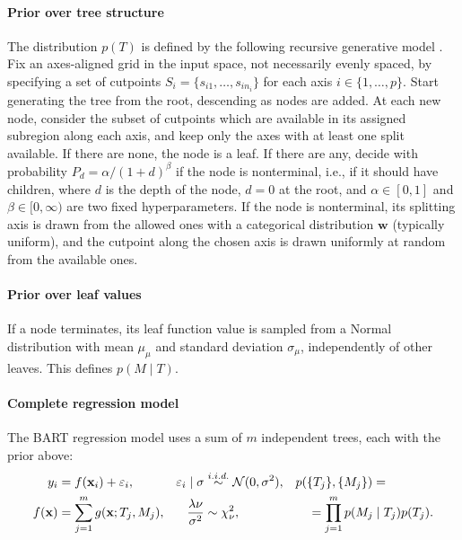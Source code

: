 \documentclass[a4paper]{article}
\theoremstyle{definition}
\begin{document}
    \paragraph{Prior over tree structure}

    The distribution $p(T)$ is defined by the following recursive generative model \autocite[see][]{chipman1998}. Fix an axes-aligned grid in the input space, not necessarily evenly spaced, by specifying a set of cutpoints $S_i = \{s_{i1}, \ldots, s_{in_i}\}$ for each axis $i \in \{1,\ldots,p\}$. Start generating the tree from the root, descending as nodes are added. At each new node, consider the subset of cutpoints which are available in its assigned subregion along each axis, and keep only the axes with at least one split available. If there are none, the node is a leaf. If there are any, decide with probability $P_d = \alpha/(1 + d)^\beta$ if the node is nonterminal, i.e., if it should have children, where $d$ is the depth of the node, $d=0$ at the root, and $\alpha \in [0, 1]$ and $\beta \in [0,\infty)$ are two fixed hyperparameters. If the node is nonterminal, its splitting axis is drawn from the allowed ones with a categorical distribution $\mathbf w$ (typically uniform), and the cutpoint along the chosen axis is drawn uniformly at random from the available ones.

    \paragraph{Prior over leaf values}

    If a node terminates, its leaf function value is sampled from a Normal distribution with mean $\mu_\mu$ and standard deviation $\sigma_\mu$, independently of other leaves. This defines $p(M\mid T)$.

    \paragraph{Complete regression model}

    The BART regression model uses a sum of $m$ independent trees, each with the prior above:
    \begin{align}
        y_i &= f(\mathbf x_i) + \varepsilon_i, &
        \varepsilon_i \mid\sigma &\overset{i.i.d.}\sim \mathcal N(0, \sigma^2), &
        &p(\{T_j\}, \{M_j\}) = \notag \\
        f(\mathbf x) &= \sum_{j=1}^m g(\mathbf x; T_j, M_j), &
        \frac{\lambda\nu}{\sigma^2} &\sim \chi^2_\nu, &
        &\quad = \prod_{j=1}^m p(M_j \mid T_j) p(T_j). \label{eq:bartdef}
    \end{align}
\end{document}
